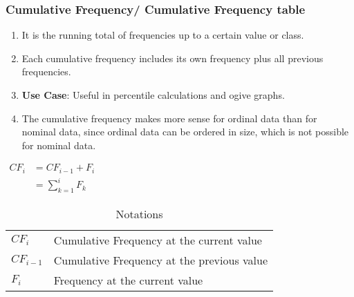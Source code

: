 \subsubsection{Cumulative Frequency/ Cumulative Frequency table \cite{statistics/book/Statistics-for-Data-Scientists/Maurits-Kaptein}}\label{Data/Describing Data/Frequency or Frequency table/Cumulative}

\begin{enumerate}
    \item It is the running total of frequencies up to a certain value or class. \cite{common/online/chatgpt}

    \item Each cumulative frequency includes its own frequency plus all previous frequencies. \cite{common/online/chatgpt}

    \item \textbf{Use Case}: Useful in percentile calculations and ogive graphs. \cite{common/online/chatgpt}

    \item The cumulative frequency makes more sense for ordinal data than for nominal data, since ordinal data can be ordered in size, which is not possible for nominal data. \cite{statistics/book/Statistics-for-Data-Scientists/Maurits-Kaptein}
\end{enumerate}

\begin{table}[H]
    \begin{minipage}[H]{0.3\linewidth}
    $
        \begin{aligned}
            CF_i 
                &= CF_{i-1} + F_{i} \\
                &= \sum_{k=1}^{i} F_{k}
        \end{aligned}
    $
    \end{minipage}
    \begin{minipage}[H]{0.65\linewidth}
        \begin{table}[H]
            \begin{tabular}{l l}
                $CF_i$ & Cumulative Frequency at the current value \\ 
                $CF_{i-1}$ & Cumulative Frequency at the previous value \\ 
                $F_i$ & Frequency at the current value \\ 
            \end{tabular}
            \caption*{Notations}
        \end{table}
    \end{minipage}
\end{table}



